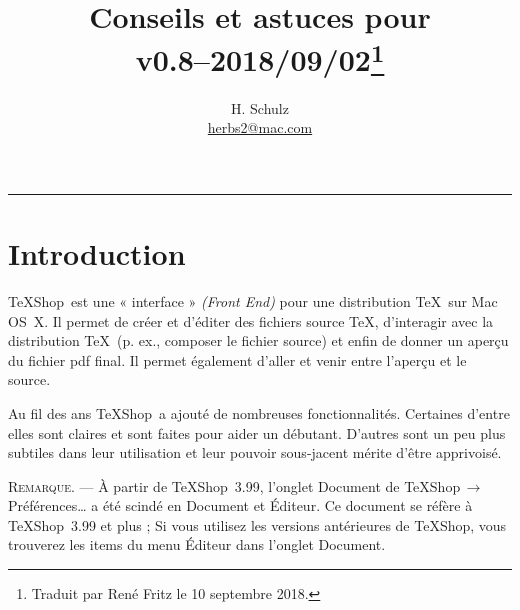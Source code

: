 \documentclass[11pt,french]{article}
\title{Conseils et astuces pour \TS\\\small v0.8--2018/09/02\thanks{Traduit par René Fritz le 10 septembre 2018.}}
\author{H. Schulz\\\small\href{mailto:herbs2@mac.com}{herbs2@mac.com}}
\date{}
\newcommand{\TS}{\textsf{\TeX Shop}}
\newcommand{\acr}[1]{\textsf{#1}}
\newcommand{\mnu}[1]{\textsf{#1}}
\newcommand{\To}{\,\(\to\)\,}
\begin{document}
\maketitle

\tableofcontents

\begin{center}
\rule{0.5\textwidth}{1pt}
\end{center}

\section{Introduction}



\TS\ est une « interface » \emph{(Front End)} pour une distribution \TeX\ sur Mac OS~X. Il permet de créer et d'éditer des fichiers source \TeX{}, d'interagir avec la distribution \TeX\ (p. ex., composer le fichier source) et enfin de donner un aperçu du fichier \acr{pdf} final. Il permet également d'aller et venir entre l'aperçu et le source.


Au fil des ans \TS\ a ajouté de nombreuses fonctionnalités. Certaines d'entre elles sont claires et sont faites pour aider un débutant. D'autres sont un peu plus subtiles dans leur utilisation et leur pouvoir sous-jacent mérite d'être apprivoisé.



\textsc{Remarque}. --- À partir de \TS\ 3.99, l'onglet \mnu{Document} de \mnu{TeXShop}\To\mnu{Préférences…} a été scindé en \mnu{Document} et \mnu{Éditeur}. Ce document se réfère à \TS\ 3.99 et plus ; Si vous utilisez les versions antérieures de \TS, vous trouverez les items du menu \mnu{Éditeur} dans l'onglet \mnu{Document}.
\end{document}
